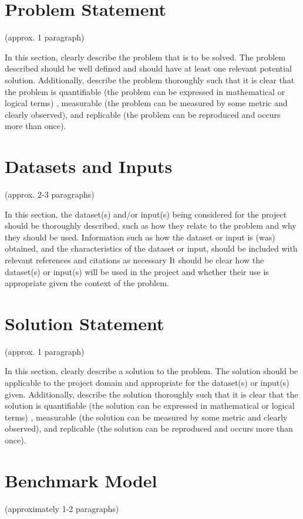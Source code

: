 \documentclass{article}
\begin{document}
\section{Problem Statement}
\label{sec:problem}
(approx. 1 paragraph)

In this section, clearly describe the problem that is to be solved. The problem described should be well defined and should have at least one relevant potential solution. Additionally, describe the problem thoroughly such that it is clear that the problem is quantifiable (the problem can be expressed in mathematical or logical terms) , measurable (the problem can be measured by some metric and clearly observed), and replicable (the problem can be reproduced and occurs more than once).


\section{Datasets and Inputs}
\label{sec:datasets}
(approx. 2-3 paragraphs)

In this section, the dataset(s) and/or input(s) being considered for the project should be thoroughly described, such as how they relate to the problem and why they should be used. Information such as how the dataset or input is (was) obtained, and the characteristics of the dataset or input, should be included with relevant references and citations as necessary It should be clear how the dataset(s) or input(s) will be used in the project and whether their use is appropriate given the context of the problem.


\section{Solution Statement}
\label{sec:solution}
(approx. 1 paragraph)

In this section, clearly describe a solution to the problem. The solution should be applicable to the project domain and appropriate for the dataset(s) or input(s) given. Additionally, describe the solution thoroughly such that it is clear that the solution is quantifiable (the solution can be expressed in mathematical or logical terms) , measurable (the solution can be measured by some metric and clearly observed), and replicable (the solution can be reproduced and occurs more than once).


\section{Benchmark Model}
\label{sec:benchmark}
(approximately 1-2 paragraphs)
\end{document}
